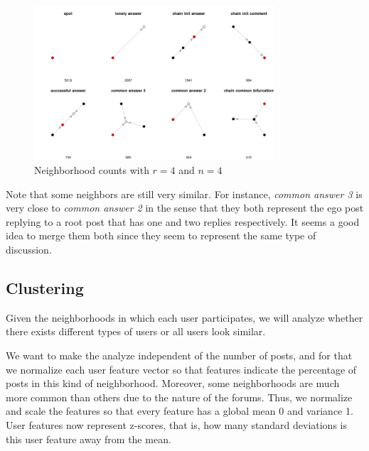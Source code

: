 \documentclass[smallextended]{svjour3}          %
\begin{document}
\begin{figure}
	\centering
	\includegraphics[width=0.8\textwidth]{neighborhoods_4_4}
	\caption{Neighborhood counts with $r=4$ and $n=4$}
	\label{fig:neighborhoods_4_4}
\end{figure}

Note that some neighbors are still very similar. For instance, \textit{common answer 3} is very close to \textit{common answer 2} in the sense that they both represent the ego post replying to a root post that has one and two replies respectively. It seems a good idea to merge them both since they seem to represent the same type of discussion.

\subsection{Clustering}

Given the neighborhoods in which each user participates, we will analyze whether there exists different types of users or all users look similar.

We want to make the analyze independent of the number of posts, and for that we normalize each user feature vector so that features indicate the percentage of posts in this kind of neighborhood. Moreover, some neighborhoods are much more common than others due to the nature of the forums. Thus, we normalize and scale the features so that every feature has a global mean 0 and variance 1. User features now represent z-scores, that is, how many standard deviations is this user feature away from the mean.
\end{document}
